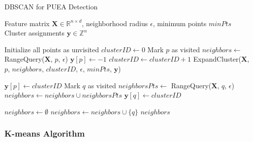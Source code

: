 \begin{algorithm}[H]
\caption{DBSCAN for PUEA Detection}
\label{alg:dbscan_full}
\begin{algorithmic}[1]
\Require Feature matrix $\mathbf{X} \in \mathbb{R}^{n \times d}$, neighborhood radius $\epsilon$, minimum points $minPts$
\Ensure Cluster assignments $\mathbf{y} \in \mathbb{Z}^n$

\State Initialize all points as unvisited
\State $clusterID \gets 0$
    \State Mark $p$ as visited
    \State $neighbors \gets$ RangeQuery($\mathbf{X}$, $p$, $\epsilon$)
        \State $\mathbf{y}[p] \gets -1$ 
    \Else
        \State $clusterID \gets clusterID + 1$
        \State ExpandCluster($\mathbf{X}$, $p$, $neighbors$, $clusterID$, $\epsilon$, $minPts$, $\mathbf{y}$)
    \EndIf
\EndFor

    \State $\mathbf{y}[p] \gets clusterID$
            \State Mark $q$ as visited
            \State $neighborsPts \gets$ RangeQuery($\mathbf{X}$, $q$, $\epsilon$)
                \State $neighbors \gets neighbors \cup neighborsPts$
            \EndIf
        \EndIf
         
            \State $\mathbf{y}[q] \gets clusterID$
        \EndIf
    \EndFor
\EndFunction

    \State $neighbors \gets \emptyset$
            \State $neighbors \gets neighbors \cup \{q\}$
        \EndIf
    \EndFor
    \State \Return $neighbors$
\EndFunction
\end{algorithmic}
\end{algorithm}

\subsubsection{K-means Algorithm}

